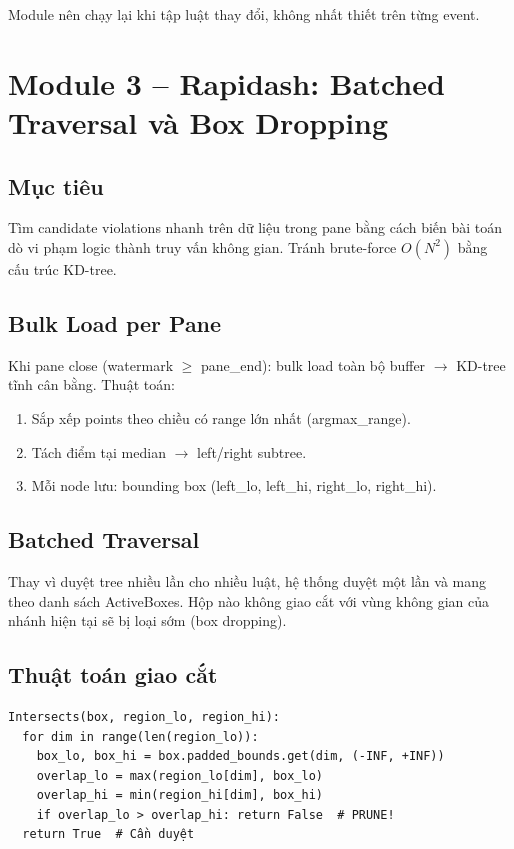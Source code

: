Module nên chạy lại khi tập luật thay đổi, không nhất thiết trên từng event.

\section{Module 3 -- Rapidash: Batched Traversal và Box Dropping}

\subsection{Mục tiêu}
Tìm candidate violations nhanh trên dữ liệu trong pane bằng cách biến bài toán dò vi phạm logic thành truy vấn không gian. Tránh brute-force $O(N^2)$ bằng cấu trúc KD-tree.

\subsection{Bulk Load per Pane}
Khi pane close (watermark $\geq$ pane\_end): bulk load toàn bộ buffer $\rightarrow$ KD-tree tĩnh cân bằng. Thuật toán:
\begin{enumerate}
  \item Sắp xếp points theo chiều có range lớn nhất (argmax\_range).
  \item Tách điểm tại median $\rightarrow$ left/right subtree.
  \item Mỗi node lưu: bounding box (left\_lo, left\_hi, right\_lo, right\_hi).
\end{enumerate}

\subsection{Batched Traversal}
Thay vì duyệt tree nhiều lần cho nhiều luật, hệ thống duyệt một lần và mang theo danh sách ActiveBoxes. Hộp nào không giao cắt với vùng không gian của nhánh hiện tại sẽ bị loại sớm (box dropping).

\subsection{Thuật toán giao cắt}
\begin{verbatim}
Intersects(box, region_lo, region_hi):
  for dim in range(len(region_lo)):
    box_lo, box_hi = box.padded_bounds.get(dim, (-INF, +INF))
    overlap_lo = max(region_lo[dim], box_lo)
    overlap_hi = min(region_hi[dim], box_hi)
    if overlap_lo > overlap_hi: return False  # PRUNE!
  return True  # Cần duyệt
\end{verbatim}

